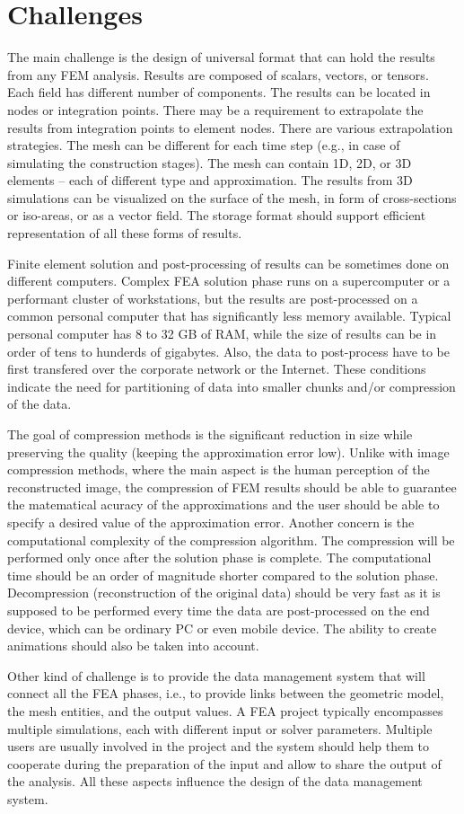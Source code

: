 \section{Challenges}

The main challenge is the design of universal format that can hold the results from any FEM analysis. Results are composed of scalars, vectors, or tensors. Each field has different number of components. The results can be located in nodes or integration points. There may be a requirement to extrapolate the results from integration points to element nodes. There are various extrapolation strategies. The mesh can be different for each time step (e.g., in case of simulating the construction stages). The mesh can contain 1D, 2D, or 3D elements -- each of different type and approximation. The results from 3D simulations can be visualized on the surface of the mesh, in form of cross-sections or iso-areas, or as a vector field. The storage format should support efficient representation of all these forms of results.

Finite element solution and post-processing of results can be sometimes done on different computers. Complex FEA solution phase runs on a supercomputer or a performant cluster of workstations, but the results are post-processed on a common personal computer that has significantly less memory available. Typical personal computer has 8 to 32 GB of RAM, while the size of results can be in order of tens to hunderds of gigabytes. Also, the data to post-process have to be first transfered over the corporate network or the Internet. These conditions indicate the need for partitioning of data into smaller chunks and/or compression of the data.

The goal of compression methods is the significant reduction in size while preserving the quality (keeping the approximation error low). Unlike with image compression methods, where the main aspect is the human perception of the reconstructed image, the compression of FEM results should be able to guarantee the matematical acuracy of the approximations and the user should be able to specify a desired value of the approximation error. Another concern is the computational complexity of the compression algorithm. The compression will be performed only once after the solution phase is complete. The computational time should be an order of magnitude shorter compared to the solution phase. Decompression (reconstruction of the original data) should be very fast as it is supposed to be performed every time the data are post-processed on the end device, which can be ordinary PC or even mobile device. The ability to create animations should also be taken into account.

Other kind of challenge is to provide the data management system that will connect all the FEA phases, i.e., to provide links between the geometric model, the mesh entities, and the output values. A FEA project typically encompasses multiple simulations, each with different input or solver parameters. Multiple users are usually involved in the project and the system should help them to cooperate during the preparation of the input and allow to share the output of the analysis. All these aspects influence the design of the data management system.